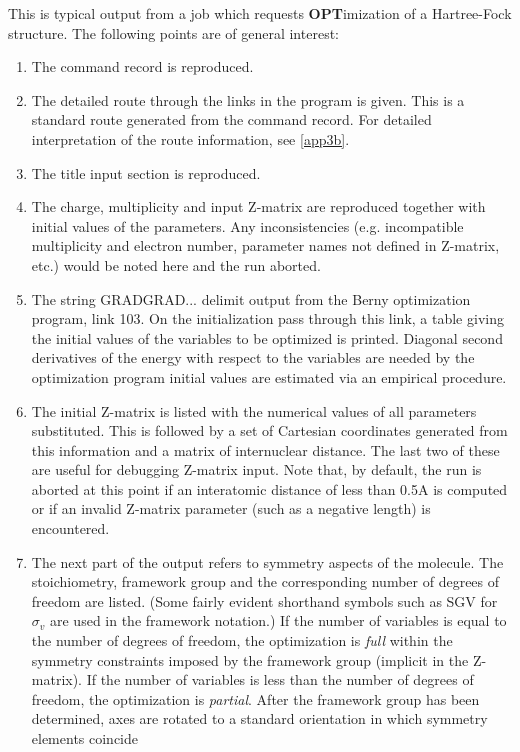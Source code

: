 This is typical output from a job which requests 
{\bf OPT}imization of a Hartree-Fock
structure.  The following points are of general interest:
\begin{enumerate}
\item  The command record is reproduced.
\item  The detailed route through the links in the program is given.  This
is a standard route generated from the command record.  For detailed
interpretation of the route information, see \ref{app3b}.
\item  The title input section is reproduced.
\item  The charge, multiplicity and input Z-matrix are reproduced together
with initial values of the parameters.  Any inconsistencies (e.g.
incompatible multiplicity and electron number, parameter names not
defined in Z-matrix, etc.) would be noted here and the run aborted.
\item  The string GRADGRAD... delimit output from the Berny optimization
program, link 103.  On the initialization pass through this link, a
table giving the initial values of the variables to be optimized is
printed.  Diagonal second derivatives of the energy with respect to
the variables are needed by the optimization program initial values
are estimated via an empirical procedure.
\item  The initial Z-matrix is listed with the numerical values of all
parameters substituted.  This is followed by a set of Cartesian
coordinates generated from this information and a matrix of
internuclear distance.  The last two of these are useful for debugging
Z-matrix input.  Note that, by default, the run is aborted at this
point if an interatomic distance of less than 0.5A is computed or
if an invalid Z-matrix parameter (such as a negative length) is
encountered.
\item  The next part of the output refers to symmetry aspects of the molecule.
The stoichiometry, framework group    and the corresponding number of
degrees of freedom    are listed.  (Some fairly evident shorthand
symbols such as SGV for $\sigma_v$ are used in the framework notation.) If
the number of variables is equal to the number of degrees of freedom,
the optimization is {\em full} within the symmetry constraints imposed by
the framework group (implicit in the Z-matrix).  If the number of
variables is less than the number of degrees of freedom, the optimization
is {\em partial}.  After the framework group has been determined, axes are
rotated to a standard orientation in which symmetry elements coincide

\end{enumerate}
